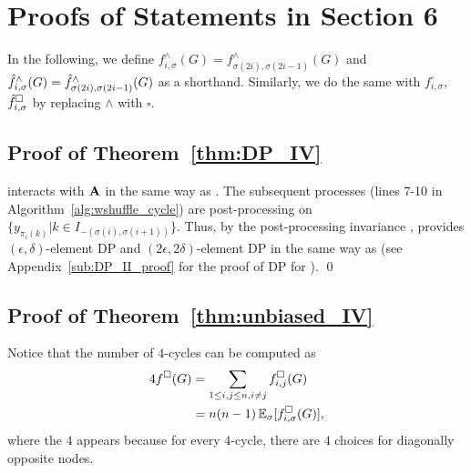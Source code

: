 
\section{Proofs of Statements in Section 6}
\label{sec:4cycle_proof}
In the following, we define
$f_{i,\sigma}^\wedge(G) = f^\wedge_{\sigma(2i), \sigma(2i-1)}(G)$ and
$\hat{f}_{i,\sigma}^\wedge(G) = \hat{f}^\wedge_{\sigma(2i), \sigma(2i-1)}(G)$ as a shorthand.
Similarly, we do the same with $f_{i,\sigma}^\square$, $\hat{f}_{i,\sigma}^\square$
by replacing $\wedge$ with $\square$.

\subsection{Proof of Theorem~\ref{thm:DP_IV}}
\label{sub:DP_IV_proof}
\AlgWSCyc{} interacts with $\mathbf{A}$ in the same way as \AlgWSTri{}. 
The subsequent processes (lines 7-10 in Algorithm~\ref{alg:wshuffle_cycle}) are post-processing on $\{y_{\pi_i(k)} | k \in I_{-(\sigma(i),\sigma(i+1))}\}$. 
Thus, by the post-processing invariance \cite{DP}, \AlgWSCyc{} provides
$(\epsilon, \delta)$-element DP and $(2\epsilon, 2\delta)$-element DP in the same way as \AlgWSTri{} (see Appendix~\ref{sub:DP_II_proof} for the proof of DP for \AlgWSTri{}). \qed

\subsection{Proof of Theorem~\ref{thm:unbiased_IV}}
\label{sub:unbiased_IV_proof}
  Notice that the number of $4$-cycles can be computed as
  \begin{align}
    4f^\square(G) &= \sum_{1 \leq i,j \leq n, i \neq j} f_{i,j}^\square(G) \\
    &= n(n-1)\operatorname{\mathbb{E}}_{\sigma}[f_{i,\sigma}^\square(G)],\label{eq:4-cycle-calc}
  \end{align}
  where the $4$ appears because for every $4$-cycle, there are $4$ choices for
  diagonally opposite nodes.

